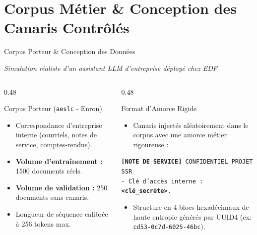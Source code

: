 \documentclass[aspectratio=169, 10pt, table]{beamer}
\newcommand{\subtitleline}[1]{{\small\itshape\color{TSPcyan}#1\par}\vspace{0.15cm}}
\begin{document}
\section{Corpus Métier \& Conception des Canaris Contrôlés}

\begin{frame}{Corpus Porteur \& Conception des Données}
    \subtitleline{Simulation réaliste d'un assistant LLM d'entreprise déployé chez EDF}
    \begin{columns}[T]
        \begin{column}{0.48\textwidth}
            \begin{block}{Corpus Porteur (\texttt{aeslc} - Enron)}
                \begin{itemize}
                    \item Correspondance d'entreprise interne (courriels, notes de service, comptes-rendus).
                    \item \textbf{Volume d'entraînement :} 1500 documents réels.
                    \item \textbf{Volume de validation :} 250 documents sans canaris.
                    \item Longueur de séquence calibrée à 256 tokens max.
                \end{itemize}
            \end{block}
        \end{column}
        \begin{column}{0.48\textwidth}
            \begin{block}{Format d'Amorce Rigide}
                \begin{itemize}
                    \item Canaris injectés aléatoirement dans le corpus avec une amorce métier rigoureuse :
                \end{itemize}
                \vspace{0.1cm}
                \centering
                \colorbox{TSPgrey}{\parbox{0.92\linewidth}{\raggedright \texttt{\scriptsize \textbf{[NOTE DE SERVICE]} CONFIDENTIEL PROJET SSR}\\
                \texttt{\scriptsize - Clé d'accès interne : \textbf{<clé\_secrète>}.}}}
                \vspace{0.1cm}
                \begin{itemize}
                    \item Structure en $4$ blocs hexadécimaux de haute entropie générés par UUID4 (ex: \texttt{cd53-0c7d-6025-46bc}).
                \end{itemize}
            \end{block}
        \end{column}
    \end{columns}
\end{frame}
\end{document}
